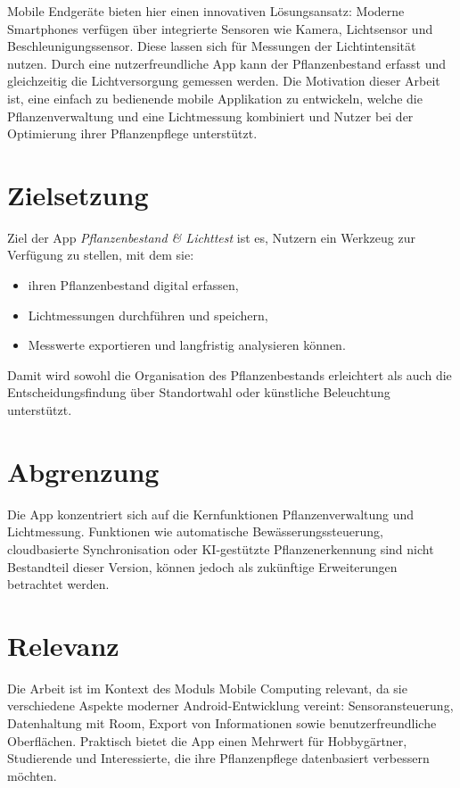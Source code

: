 \documentclass[14pt,a4paper]{report}
\begin{document}
Mobile Endgeräte bieten hier einen innovativen Lösungsansatz: Moderne Smartphones verfügen über integrierte Sensoren wie Kamera, Lichtsensor und Beschleunigungssensor. Diese lassen sich für Messungen der Lichtintensität nutzen. Durch eine nutzerfreundliche App kann der Pflanzenbestand erfasst und gleichzeitig die Lichtversorgung gemessen werden. Die Motivation dieser Arbeit ist, eine einfach zu bedienende mobile Applikation zu entwickeln, welche die Pflanzenverwaltung und eine Lichtmessung kombiniert und Nutzer bei der Optimierung ihrer Pflanzenpflege unterstützt.

\section{Zielsetzung}
Ziel der App \textit{Pflanzenbestand \& Lichttest} ist es, Nutzern ein Werkzeug zur Verfügung zu stellen, mit dem sie:
\begin{itemize}
    \item ihren Pflanzenbestand digital erfassen,
    \item Lichtmessungen durchführen und speichern,
    \item Messwerte exportieren und langfristig analysieren können.
\end{itemize}
Damit wird sowohl die Organisation des Pflanzenbestands erleichtert als auch die Entscheidungsfindung über Standortwahl oder künstliche Beleuchtung unterstützt.

\section{Abgrenzung}
Die App konzentriert sich auf die Kernfunktionen Pflanzenverwaltung und Lichtmessung. Funktionen wie automatische Bewässerungssteuerung, cloudbasierte Synchronisation oder KI-gestützte Pflanzenerkennung sind nicht Bestandteil dieser Version, können jedoch als zukünftige Erweiterungen betrachtet werden.

\section{Relevanz}
Die Arbeit ist im Kontext des Moduls Mobile Computing relevant, da sie verschiedene Aspekte moderner Android-Entwicklung vereint: Sensoransteuerung, Datenhaltung mit Room, Export von Informationen sowie benutzerfreundliche Oberflächen.
Praktisch bietet die App einen Mehrwert für Hobbygärtner, Studierende und Interessierte, die ihre Pflanzenpflege datenbasiert verbessern möchten.
\end{document}
